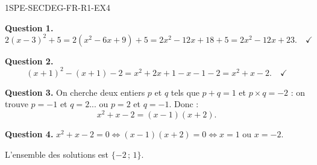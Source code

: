 
\begin{corrige}{1SPE-SECDEG-FR-R1-EX4}

\textbf{Question 1.}
\[
2(x-3)^2 + 5 = 2(x^2 - 6x + 9) + 5 = 2x^2 - 12x + 18 + 5 = 2x^2 - 12x + 23. \quad \checkmark
\]

\textbf{Question 2.}
\[
(x+1)^2 - (x+1) - 2 = x^2 + 2x + 1 - x - 1 - 2 = x^2 + x - 2. \quad \checkmark
\]

\textbf{Question 3.} On cherche deux entiers $p$ et $q$ tels que $p + q = 1$ et $p \times q = -2$ : on trouve $p = -1$ et $q = 2$... ou $p = 2$ et $q = -1$. Donc :
\[
x^2 + x - 2 = (x - 1)(x + 2).
\]

\textbf{Question 4.} $x^2 + x - 2 = 0 \Leftrightarrow (x-1)(x+2) = 0 \Leftrightarrow x = 1$ ou $x = -2$.

L'ensemble des solutions est $\{-2\,;\,1\}$.

\end{corrige}
